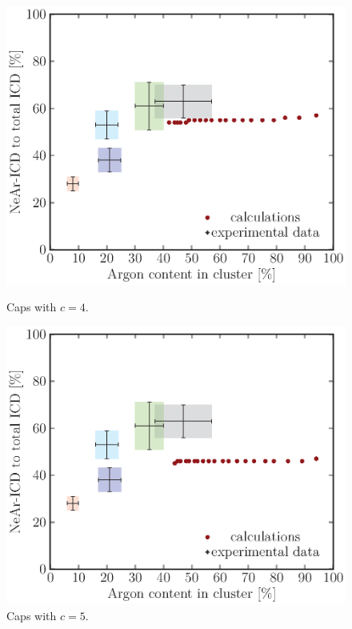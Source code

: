 \begin{figure}[!h]
\begin{minipage}{0.48\textwidth}
    \centering
    \includegraphics[scale=0.5]{pics/caps04.ps}
    \caption{Caps with $c=4$.}
    \label{caps04}
\end{minipage}
\hfill
\begin{minipage}{0.48\textwidth}
    \centering
    \includegraphics[scale=0.5]{pics/caps05.ps}
    \caption{Caps with $c=5$.}
    \label{caps05}
\end{minipage}
\end{figure}

